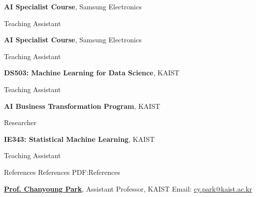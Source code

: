 \documentclass[letterpaper,MMMyyyy,nonstopmode]{simpleresumecv}
\begin{document}
\begin{Body}
\BulletItem
\textbf{AI Specialist Course}, Samsung Electronics
\hfill
{}
\begin{Detail}
\Item
Teaching Assistant
\end{Detail}

\Gap
\BulletItem
\textbf{AI Specialist Course}, Samsung Electronics
\hfill
{}
\begin{Detail}
\Item
Teaching Assistant
\end{Detail}

\Gap
\BulletItem
\textbf{DS503: Machine Learning for Data Science}, KAIST
\hfill
{}
\begin{Detail}
\Item
Teaching Assistant
\end{Detail}

\Gap
\BulletItem
\textbf{AI Business Transformation Program}, KAIST
\hfill
{}
\begin{Detail}
\Item
Researcher
\end{Detail}

\Gap
\BulletItem
\textbf{IE343: Statistical Machine Learning}, KAIST
\hfill
{}
\begin{Detail}
\Item
Teaching Assistant
\end{Detail}



\Section
{References}
{References}
{PDF:References}

\BulletItem
\href{https://dsail.kaist.ac.kr/professor/}
{\textbf{Prof. Chanyoung Park}},
Assistant Professor, KAIST
\newline
Email: \href{mailto:cy.park@kaist.ac.kr}
{cy.park@kaist.ac.kr}








\end{Body}
\end{document}
